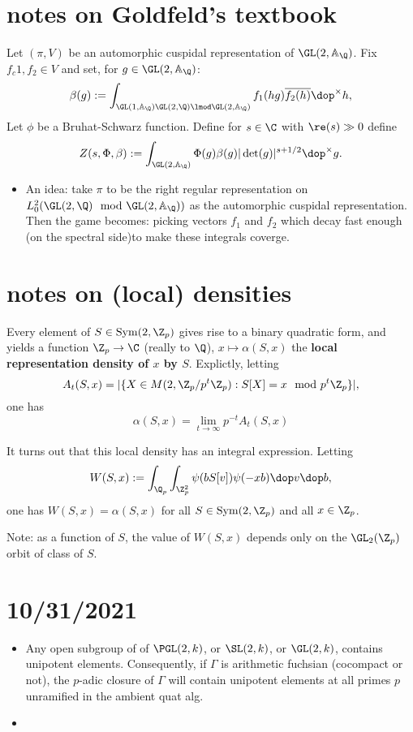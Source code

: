 \documentclass[11pt]{amsart}
\begin{document}
\section{notes on Goldfeld's textbook}
Let $(\pi,V)$ be an automorphic cuspidal representation of $\GL(2,\Adeles_\Q)$. Fix $f_c1,f_2 \in V$  and set, for $g\in \GL(2,\Adeles_\Q)$: 
	\begin{align*}
		\beta(g):= \int_{\GL(1,\Adeles_\Q)\GL(2,\Q) \lmod \GL(2,\Adeles_\Q)} f_1(hg)\overline{f_2(h)} \dop ^\times h,
	\end{align*}
Let $\phi$ be a Bruhat-Schwarz function. Define for $s\in \C$ with $\re(s) \gg 0$ define 
	\begin{align*}
		Z(s,\Phi,\beta):= \int_{\GL(2,\Adeles_\Q)} \Phi(g) \beta(g) |\det(g)|^{s+1/2} \dop^\times g.
	\end{align*}
\begin{itemize}
	\item An idea: take $\pi$ to be the right regular representation on $L^2_0(\GL(2,\Q) \mod \GL(2,\Adeles_\Q))$ as the automorphic cuspidal representation. Then the game becomes: picking vectors $f_1$ and $f_2$ which decay fast enough (on the spectral side)to make these integrals coverge.  
\end{itemize}

\section{notes on (local) densities}
Every element of $S\in \Sym (2,\Z_p) $ gives rise to a binary quadratic form, and yields a function  $\Z_p \to \C$ (really to $\Q$),  $x\mapsto \alpha(S,x)$ the \textbf{local representation density of $x$ by $S$}. Explictly, letting 
$$A_t(S,x)= |\{ X \in M(2,\Z_p /p^t \Z_p): S[X]=x \mod p^t \Z_p\}|,$$ 
one has
$$ \alpha(S,x) = \lim_{t\to \infty} p^{-t} A_t(S,x) $$ 

It turns out that this local density has an integral expression. Letting
$$W(S,x):= \int_{\Q_p} \int_{\Z_p^2}\psi(b S[v]) \psi(-xb) \dop v \dop b,$$
one has $W(S,x)=\alpha(S,x)$ for all $S \in \Sym(2,\Z_p)$ and all $x\in \Z_p$. 

Note: as a function of $S$, the value of $W(S,x)$ depends only on the $\GL_2(\Z_p)$ orbit of class of $S$. 
\section{10/31/2021}

\begin{itemize}
	\item Any open subgroup of of $\PGL(2,k)$, or $\SL(2,k)$, or $\GL(2,k)$, contains unipotent elements. Consequently, if $\Gamma$ is arithmetic fuchsian (cocompact or not), the $p$-adic closure of $\Gamma$ will contain unipotent elements at all primes $p$ unramified in the ambient quat alg.  
	\item 	
\end{itemize}
\end{document}
